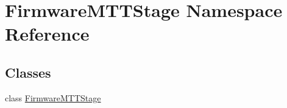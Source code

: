 \hypertarget{namespaceFirmwareMTTStage}{\section{Firmware\-M\-T\-T\-Stage Namespace Reference}
\label{namespaceFirmwareMTTStage}
}
\subsection*{Classes}
\begin{DoxyCompactItemize}
\item 
class \hyperlink{classFirmwareMTTStage_1_1FirmwareMTTStage}{Firmware\-M\-T\-T\-Stage}
\end{DoxyCompactItemize}
